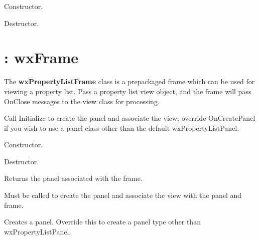 Constructor.



Destructor.


\section{: wxFrame}\label{wxpropertylistframe}

The {\bf wxPropertyListFrame} class is a prepackaged frame which can
be used for viewing a property list. Pass a property list view object, and the frame
will pass OnClose messages to the view class for processing.

Call Initialize to create the panel and associate the view; override OnCreatePanel
if you wish to use a panel class other than the default wxPropertyListPanel.



Constructor.



Destructor.



Returns the panel associated with the frame.



Must be called to create the panel and associate the view with the panel and frame.



Creates a panel. Override this to create a panel type other than wxPropertyListPanel.


